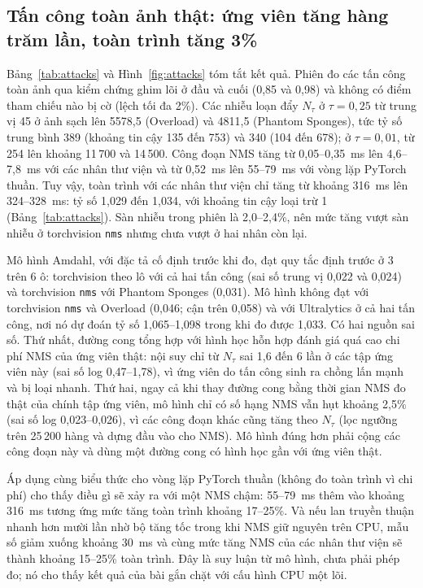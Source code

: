 \documentclass[a4paper,fleqn]{cas-dc}
\newcommand{\Ntau}{N_{\tau}}
\begin{document}
\subsection{Tấn công toàn ảnh thật: ứng viên tăng hàng trăm lần, toàn trình tăng 3\%}
\label{sec:attacks}
Bảng~\ref{tab:attacks} và Hình~\ref{fig:attacks} tóm tắt kết quả. Phiên đo các tấn công toàn ảnh qua kiểm chứng ghim lõi ở đầu và cuối (0,85 và 0,98) và không có điểm tham chiếu nào bị cờ (lệch tối đa 2\%). Các nhiễu loạn đẩy $\Ntau$ ở $\tau=0{,}25$ từ trung vị 45 ở ảnh sạch lên 5578,5 (Overload) và 4811,5 (Phantom Sponges), tức tỷ số trung bình 389 (khoảng tin cậy 135 đến 753) và 340 (104 đến 678); ở $\tau=0{,}01$, từ 254 lên khoảng 11\,700 và 14\,500. Công đoạn NMS tăng từ 0,05--0,35~ms lên 4,6--7,8~ms với các nhân thư viện và từ 0,52~ms lên 55--79~ms với vòng lặp PyTorch thuần. Tuy vậy, toàn trình với các nhân thư viện chỉ tăng từ khoảng 316~ms lên 324--328~ms: tỷ số 1,029 đến 1,034, với khoảng tin cậy loại trừ 1 (Bảng~\ref{tab:attacks}). Sàn nhiễu trong phiên là 2,0--2,4\%, nên mức tăng vượt sàn nhiễu ở torchvision \texttt{nms} nhưng chưa vượt ở hai nhân còn lại.

Mô hình Amdahl, với đặc tả cố định trước khi đo, đạt quy tắc định trước ở 3 trên 6 ô: torchvision theo lô với cả hai tấn công (sai số trung vị 0,022 và 0,024) và torchvision \texttt{nms} với Phantom Sponges (0,031). Mô hình không đạt với torchvision \texttt{nms} và Overload (0,046; cận trên 0,058) và với Ultralytics ở cả hai tấn công, nơi nó dự đoán tỷ số 1,065--1,098 trong khi đo được 1,033. Có hai nguồn sai số. Thứ nhất, đường cong tổng hợp với hình học hỗn hợp đánh giá quá cao chi phí NMS của ứng viên thật: nội suy chỉ từ $\Ntau$ sai 1,6 đến 6 lần ở các tập ứng viên này (sai số log 0,47--1,78), vì ứng viên do tấn công sinh ra chồng lấn mạnh và bị loại nhanh. Thứ hai, ngay cả khi thay đường cong bằng thời gian NMS đo thật của chính tập ứng viên, mô hình chỉ có số hạng NMS vẫn hụt khoảng 2,5\% (sai số log 0,023--0,026), vì các công đoạn khác cũng tăng theo $\Ntau$ (lọc ngưỡng trên 25\,200 hàng và dựng đầu vào cho NMS). Mô hình đúng hơn phải cộng các công đoạn này và dùng một đường cong có hình học gần với ứng viên thật.

Áp dụng cùng biểu thức cho vòng lặp PyTorch thuần (không đo toàn trình vì chi phí) cho thấy điều gì sẽ xảy ra với một NMS chậm: 55--79~ms thêm vào khoảng 316~ms tương ứng mức tăng toàn trình khoảng 17--25\%. Và nếu lan truyền thuận nhanh hơn mười lần nhờ bộ tăng tốc trong khi NMS giữ nguyên trên CPU, mẫu số giảm xuống khoảng 30~ms và cùng mức tăng NMS của các nhân thư viện sẽ thành khoảng 15--25\% toàn trình. Đây là suy luận từ mô hình, chưa phải phép đo; nó cho thấy kết quả của bài gắn chặt với cấu hình CPU một lõi.
\end{document}
